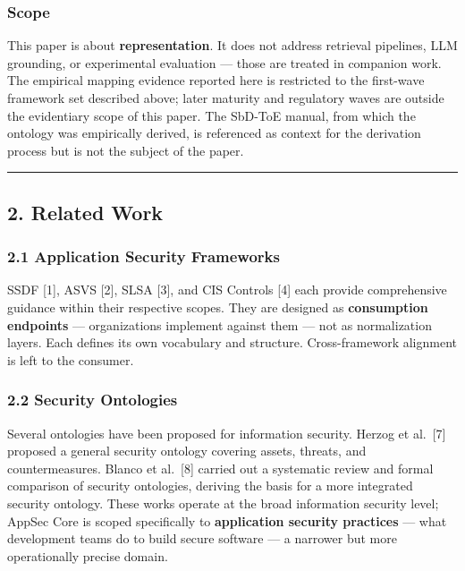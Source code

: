 \documentclass[
]{article}
\begin{document}
\subsubsection{Scope}\label{scope}

This paper is about \textbf{representation}. It does not address
retrieval pipelines, LLM grounding, or experimental evaluation --- those
are treated in companion work. The empirical mapping evidence reported
here is restricted to the first-wave framework set described above;
later maturity and regulatory waves are outside the evidentiary scope of
this paper. The SbD-ToE manual, from which the ontology was empirically
derived, is referenced as context for the derivation process but is not
the subject of the paper.

\begin{center}\rule{0.5\linewidth}{0.5pt}\end{center}

\subsection{2. Related Work}\label{related-work}

\subsubsection{2.1 Application Security
Frameworks}\label{application-security-frameworks}

SSDF {[}1{]}, ASVS {[}2{]}, SLSA {[}3{]}, and CIS Controls {[}4{]} each
provide comprehensive guidance within their respective scopes. They are
designed as \textbf{consumption endpoints} --- organizations implement
against them --- not as normalization layers. Each defines its own
vocabulary and structure. Cross-framework alignment is left to the
consumer.

\subsubsection{2.2 Security Ontologies}\label{security-ontologies}

Several ontologies have been proposed for information security. Herzog
et al.~{[}7{]} proposed a general security ontology covering assets,
threats, and countermeasures. Blanco et al.~{[}8{]} carried out a
systematic review and formal comparison of security ontologies, deriving
the basis for a more integrated security ontology. These works operate
at the broad information security level; AppSec Core is scoped
specifically to \textbf{application security practices} --- what
development teams do to build secure software --- a narrower but more
operationally precise domain.
\end{document}

